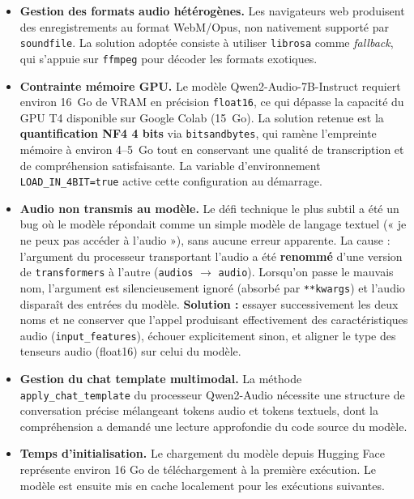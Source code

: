 \documentclass[12pt,a4paper]{report}
\begin{document}
\begin{itemize}
  \item \textbf{Gestion des formats audio hétérogènes.} Les navigateurs web produisent des
        enregistrements au format WebM/Opus, non nativement supporté par
        \texttt{soundfile}. La solution adoptée consiste à utiliser \texttt{librosa} comme
        \textit{fallback}, qui s'appuie sur \texttt{ffmpeg} pour décoder les formats
        exotiques.

  \item \textbf{Contrainte mémoire GPU.} Le modèle Qwen2-Audio-7B-Instruct requiert
        environ 16~Go de VRAM en précision \texttt{float16}, ce qui dépasse la capacité
        du GPU T4 disponible sur Google Colab (15~Go). La solution retenue est la
        \textbf{quantification NF4 4 bits} via \texttt{bitsandbytes}, qui ramène
        l'empreinte mémoire à environ 4--5~Go tout en conservant une qualité de
        transcription et de compréhension satisfaisante. La variable d'environnement
        \texttt{LOAD\_IN\_4BIT=true} active cette configuration au démarrage.

  \item \textbf{Audio non transmis au modèle.} Le défi technique le plus subtil a été
        un bug où le modèle répondait comme un simple modèle de langage textuel
        (« je ne peux pas accéder à l'audio »), sans aucune erreur apparente. La cause :
        l'argument du processeur transportant l'audio a été \textbf{renommé} d'une
        version de \texttt{transformers} à l'autre (\texttt{audios} $\rightarrow$
        \texttt{audio}). Lorsqu'on passe le mauvais nom, l'argument est silencieusement
        ignoré (absorbé par \texttt{**kwargs}) et l'audio disparaît des entrées du modèle.
        \textbf{Solution :} essayer successivement les deux noms et ne conserver que
        l'appel produisant effectivement des caractéristiques audio
        (\texttt{input\_features}), échouer explicitement sinon, et aligner le type des
        tenseurs audio (float16) sur celui du modèle.

  \item \textbf{Gestion du chat template multimodal.} La méthode
        \texttt{apply\_chat\_template} du processeur Qwen2-Audio nécessite une structure
        de conversation précise mélangeant tokens audio et tokens textuels, dont la
        compréhension a demandé une lecture approfondie du code source du modèle.

  \item \textbf{Temps d'initialisation.} Le chargement du modèle depuis Hugging Face
        représente environ 16 Go de téléchargement à la première exécution. Le modèle est
        ensuite mis en cache localement pour les exécutions suivantes.
\end{itemize}
\end{document}
